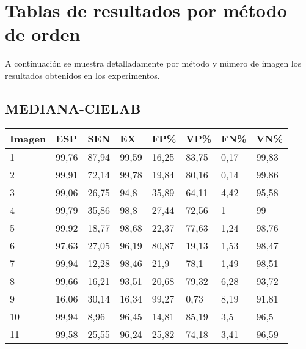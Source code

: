 \chapter{Tablas de resultados por método de orden}
\label{chap:ApendiceA}
A continuación se muestra detalladamente por método y número de imagen los resultados obtenidos en los experimentos.
\fontsize{9}{11}\selectfont
\section{MEDIANA-CIELAB}
\begin{longtable}[c]{|l|l|l|l|l|l|l|l|}
\hline
\textbf{Imagen} & \textbf{ESP} & \textbf{SEN} & \textbf{EX} & \textbf{FP\%} & \textbf{VP\%} & \textbf{FN\%} & \textbf{VN\%} \\ \hline
\endfirsthead
%
\endhead
%
1               & 99,76        & 87,94        & 99,59       & 16,25         & 83,75         & 0,17          & 99,83         \\ \hline
2               & 99,91        & 72,14        & 99,78       & 19,84         & 80,16         & 0,14          & 99,86         \\ \hline
3               & 99,06        & 26,75        & 94,8        & 35,89         & 64,11         & 4,42          & 95,58         \\ \hline
4               & 99,79        & 35,86        & 98,8        & 27,44         & 72,56         & 1             & 99            \\ \hline
5               & 99,92        & 18,77        & 98,68       & 22,37         & 77,63         & 1,24          & 98,76         \\ \hline
6               & 97,63        & 27,05        & 96,19       & 80,87         & 19,13         & 1,53          & 98,47         \\ \hline
7               & 99,94        & 12,28        & 98,46       & 21,9          & 78,1          & 1,49          & 98,51         \\ \hline
8               & 99,66        & 16,21        & 93,51       & 20,68         & 79,32         & 6,28          & 93,72         \\ \hline
9               & 16,06        & 30,14        & 16,34       & 99,27         & 0,73          & 8,19          & 91,81         \\ \hline
10              & 99,94        & 8,96         & 96,45       & 14,81         & 85,19         & 3,5           & 96,5          \\ \hline
11              & 99,58        & 25,55        & 96,24       & 25,82         & 74,18         & 3,41          & 96,59         \\ \hline

\end{longtable}
